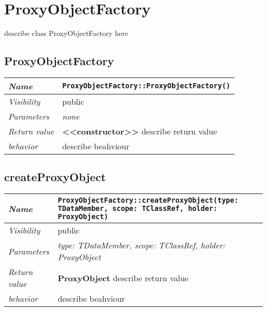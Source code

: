 \chapter{ProxyObjectFactory}
describe class ProxyObjectFactory here
\section{ProxyObjectFactory}
\begin{longtable}{p{3cm} @{\hskip 1cm} p{12cm}}
 \hline
\textit{Name} & \texttt{ProxyObjectFactory::ProxyObjectFactory()}\\
\hline
 \textit{Visibility} & public\\
\hline
\textit{Parameters} & \textit{none}\\
\hline
\textit{Return value} & \textbf{ <<constructor>>} describe return value\\
  \hline
 \textit{behavior} & describe beahviour \\
\hline
\end{longtable} \pagebreak
 \section{createProxyObject}
\begin{longtable}{p{3cm} @{\hskip 1cm} p{12cm}}
 \hline
\textit{Name} & \texttt{ProxyObjectFactory::createProxyObject(type: TDataMember, scope: TClassRef, holder: ProxyObject)}\\
\hline
 \textit{Visibility} & public\\
\hline
\textit{Parameters} & \textit{type: TDataMember, scope: TClassRef, holder: ProxyObject}\\
\hline
\textit{Return value} & \textbf{ ProxyObject} describe return value\\
  \hline
 \textit{behavior} & describe beahviour \\
\hline
\end{longtable} \pagebreak
 